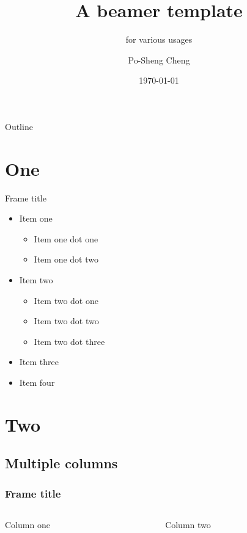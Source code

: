 \documentclass[compress, aspectratio=32]{beamer}
\title[Beamer Template]{A beamer template}
\subtitle{for various usages}
\author{Po-Sheng Cheng}
\institute{National Taiwan University}
\date{\today}
\begin{document}
\frame{\titlepage}

\begin{frame}[allowframebreaks]{Outline}
    \tableofcontents
\end{frame}

\section{One}
\frame{\sectionpage}
\begin{frame}{Frame title}
    \begin{itemize}
        \item Item one
        \begin{itemize}
            \item Item one dot one
            \item Item one dot two
        \end{itemize}
        \item Item two
        \begin{itemize}
            \item Item two dot one
            \item Item two dot two
            \item Item two dot three
        \end{itemize}
        \item Item three
        \item Item four
    \end{itemize}
\end{frame}

\section{Two}
\subsection[Columns]{Multiple columns}
\begin{frame}
    \frametitle{Frame title}
    \begin{columns}
        \begin{column}{0.5\linewidth}
            Column one
        \end{column}
        \begin{column}{0.5\linewidth}
            Column two
        \end{column}
    \end{columns}

\end{frame}
\end{document}

